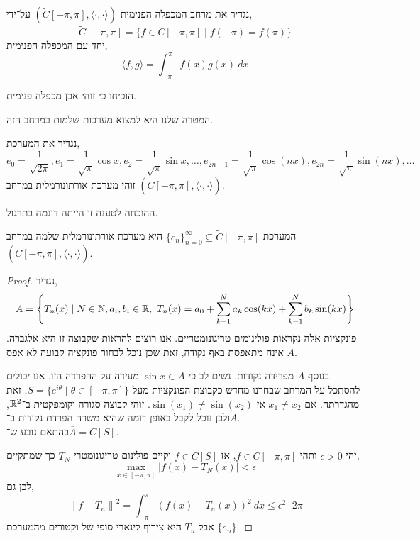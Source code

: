 \begin{definition}
	נגדיר את מרחב המכפלה הפנימית $(\tilde{C}[-\pi, \pi], \langle \cdot, \cdot \rangle)$ על־ידי,
	\[
		\tilde{C}[-\pi, \pi]
		= \{ f \in C[-\pi, \pi] \mid f(-\pi) = f(\pi) \}
	\]
	יחד עם המכפלה הפנימית,
	\[
		\langle f, g \rangle
		= \int_{-\pi}^{\pi} f(x) g(x)\ dx
	\]
\end{definition}
\begin{exercise}
	הוכיחו כי זוהי אכן מכפלה פנימית.
\end{exercise}
המטרה שלנו היא למצוא מערכות שלמות במרחב הזה.
\begin{definition}
	נגדיר את המערכת,
	\[
		e_0 = \frac{1}{\sqrt{2 \pi}},
		e_1 = \frac{1}{\sqrt{\pi}} \cos x,
		e_2 = \frac{1}{\sqrt{\pi}} \sin x,
		\ldots,
		e_{2n - 1} = \frac{1}{\sqrt{\pi}} \cos(nx),
		e_{2n} = \frac{1}{\sqrt{\pi}} \sin(nx),
		\ldots
	\]
	זוהי מערכת אורתונורמלית במרחב $(\tilde{C}[-\pi, \pi], \langle \cdot, \cdot \rangle)$.
\end{definition}
\begin{remark}
	ההוכחה לטענה זו הייתה דוגמה בתרגול.
\end{remark}
\begin{theorem}
	המערכת ${\{ e_n \}}_{n = 0}^\infty \subseteq \tilde{C}[-\pi, \pi]$ היא מערכת אורתונורמלית שלמה במרחב $(\tilde{C}[-\pi, \pi], \langle \cdot, \cdot \rangle)$.
\end{theorem}
\begin{proof}
	נגדיר,
	\[
		A
		= \left\{ T_n(x) \mid N \in \mathbb{N}, a_i, b_i \in \mathbb{R},\ T_n(x) = a_0 + \sum_{k = 1}^N a_k \cos(kx) + \sum_{k = 1}^N b_k \sin(kx) \right\}
	\]
	פונקציות אלה נקראות פולינומים טריגונומטריים.
	אנו רוצים להראות שקבוצה זו היא אלגברה.
	$A$ אינה מתאפסת באף נקודה, זאת שכן נוכל לבחור פונקציה קבועה לא אפס.

	בנוסף $A$ מפרידה נקודות.
	נשים לב כי $\sin x \in A$ מעידה על ההפרדה הזו.
	אנו יכולים להסתכל על המרחב שבחרנו מחדש כקבוצת הפונקציות מעל $S = \{ e^{i \theta} \mid \theta \in [-\pi, \pi] \}$, זאת מהגדרתה.
	אם $x_1 \ne x_2$ אז $\sin(x_1) \ne \sin(x_2)$.
	זוהי קבוצה סגורה וקומפקטית ב־$\mathbb{R}^2$, ולכן נוכל לקבל באופן דומה שהיא משרה הפרדת נקודות ב־$A$. \\
	בהתאם נובע ש־$\overline{A} = C[S]$.

	יהי $\epsilon > 0$ ותהי $f \in \tilde{C}[-\pi, \pi]$, אז $f \in C[S]$ וקיים פולינום טריגונומטרי $T_N$ כך שמתקיים,
	\[
		\max_{x \in [-\pi, \pi]} |f(x) - T_N(x)| < \epsilon
	\]
	לכן גם,
	\[
		{\lVert f - T_n \rVert}^2
		= \int_{-\pi}^{\pi} {(f(x) - T_n(x))}^2\ dx
		\le \epsilon^2 \cdot 2 \pi
	\]
	אבל $T_n$ היא צירוף לינארי סופי של וקטורים מהמערכת $\{ e_n \}$.
\end{proof}
